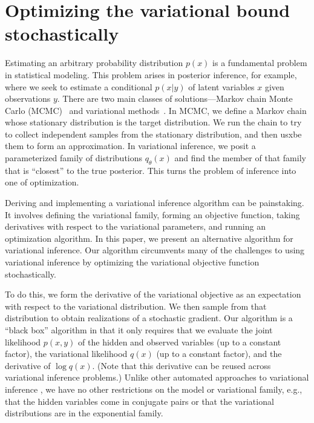 \chapter{Optimizing the variational bound stochastically}
\label{chapter:stochastic_variational_optimization}
\label{sec:stochastic_variational_optimization}

Estimating an arbitrary probability distribution $p(x)$ is a
fundamental problem in statistical modeling.  This problem arises in
posterior inference, for example, where we seek to estimate a
conditional $p(x | y)$ of latent variables $x$ given observations $y$.
There are two main classes of solutions---Markov chain Monte Carlo
(MCMC)~\cite{bishop:2006} and variational methods~\cite{jordan:1999}.
In MCMC, we define a Markov chain whose stationary distribution is the
target distribution.  We run the chain to try to collect independent
samples from the stationary distribution, and then usxbe them to form an
approximation.  In variational inference, we posit a parameterized
family of distributions $q_\theta(x)$ and find the member of that
family that is ``closest'' to the true posterior.  This turns the
problem of inference into one of optimization.

Deriving and implementing a variational inference algorithm can be
painstaking.  It involves defining the variational family, forming an
objective function, taking derivatives with respect to the variational
parameters, and running an optimization algorithm.  In this paper, we
present an alternative algorithm for variational inference.  Our
algorithm circumvents many of the challenges to using variational
inference by optimizing the variational objective function
stochastically.

To do this, we form the derivative of the variational objective as an
expectation with respect to the variational distribution. We then
sample from that distribution to obtain realizations of a stochastic
gradient.  Our algorithm is a ``black box'' algorithm in that it only
requires that we evaluate the joint likelihood $p(x, y)$ of the hidden
and observed variables (up to a constant factor), the variational
likelihood $q(x)$ (up to a constant factor), and the derivative of
$\log q(x)$.  (Note that this derivative can be reused across
variational inference problems.)  Unlike other automated approaches to
variational inference \cite{winn:2004}, we have no other restrictions
on the model or variational family, e.g., that the hidden variables
come in conjugate pairs or that the variational distributions are in
the exponential family.


